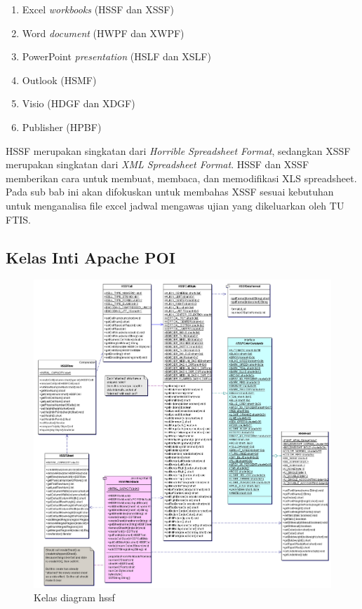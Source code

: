 \begin{enumerate}
	\item Excel \textit{workbooks} (HSSF dan XSSF)
	\item Word \textit{document} (HWPF dan XWPF)
	\item PowerPoint \textit{presentation} (HSLF dan XSLF)
	\item Outlook (HSMF)
	\item Visio (HDGF dan XDGF)
	\item Publisher (HPBF)
\end{enumerate}

HSSF merupakan singkatan dari \textit{Horrible Spreadsheet Format}, sedangkan XSSF merupakan singkatan dari \textit{XML Spreadsheet Format}. HSSF dan XSSF memberikan cara untuk membuat, membaca, dan memodifikasi XLS spreadsheet. Pada sub bab ini akan difokuskan untuk membahas XSSF sesuai kebutuhan untuk menganalisa file excel jadwal mengawas ujian yang dikeluarkan oleh TU FTIS.\cite{apachepoi}


\subsection{Kelas Inti Apache POI}
\label{subs:kelas_inti}

\begin{figure}[H]
	\centering
	\includegraphics[scale=0.3]{Gambar/hssf}
	\caption{Kelas diagram hssf}
\end{figure}

